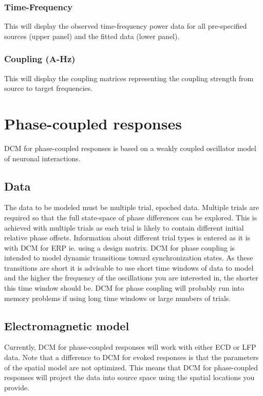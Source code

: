 \subsubsection{Time-Frequency}
This will display the observed time-frequency power data for all pre-specified sources (upper panel) and the fitted data (lower panel).

\subsubsection{Coupling (A-Hz)}
This will display the coupling matrices representing the coupling strength from source to target frequencies.

\section{Phase-coupled responses}

DCM for phase-coupled responses is based on a weakly coupled oscillator model of neuronal interactions. 

\subsection{Data}
The data to be modeled must be multiple trial, epoched data. Multiple trials are required so that the full state-space of phase differences can be explored. This is achieved with multiple trials as each trial is likely to contain different initial relative phase offsets. Information about different trial types is entered as it is with DCM for ERP ie. using a design matrix. DCM for phase coupling is intended to model dynamic transitions toward synchronization states. As these transitions are short it is advisable to use short time windows of data to model and the higher the frequency of the oscillations you are interested in, the shorter this time window should be. DCM for phase coupling will probably run into memory problems if using long time windows or large numbers of trials.

\subsection{Electromagnetic model}
Currently, DCM for phase-coupled responses will work with either ECD or LFP data.  Note that a difference to DCM for evoked responses is that the parameters of the spatial model are not optimized. This means that DCM for phase-coupled responses will project the data into source space using the spatial locations you provide.

